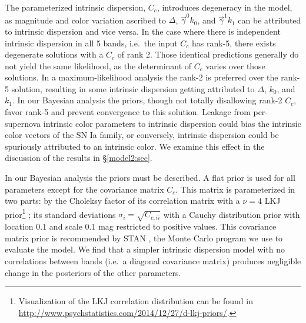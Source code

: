 \documentclass{aastex61}   	%
\begin{document}
The parameterized intrinsic dispersion, $C_c$,  introduces degeneracy in the model, as magnitude and color variation
ascribed to $\Delta$, $\vec{\gamma}^0 k_0$, and $\vec{\gamma}^1 k_1$ can  be attributed to intrinsic dispersion
\color{blue}
and vice versa.
In the case where there is independent intrinsic dispersion in all 5 bands, i.e.\  the input $C_c$ has rank-5, there exists degenerate solutions with a $C_c$ of rank 2.  Those identical predictions generally do not yield the same likelihood, as the determinant of $C_c$ varies over those solutions.  In a maximum-likelihood analysis the rank-2 is preferred over the rank-5 solution, resulting in some intrinsic dispersion getting attributed to $\Delta$, $k_0$, and $k_1$.
In our Bayesian analysis the priors, though not totally disallowing rank-2 $C_c$, favor rank-5  and prevent convergence to this solution.    
Leakage from per-supernova intrinsic color parameters to intrinsic dispersion could bias the intrinsic color vectors of the SN Ia family,  or conversely, intrinsic dispersion could be spuriously attributed to an intrinsic color.  We examine this effect in the discussion of the results in \S\ref{model2:sec}.
\color{black}
%



In our Bayesian analysis the priors must be described.  A flat prior is used for all parameters except
for the covariance matrix $C_c$.
\color{red}
This matrix is parameterized in two parts: by the Choleksy factor of its
\color{black}
correlation matrix with a $\nu=4$  LKJ prior\footnote{
Visualization of the LKJ correlation distribution can be found in \url{http://www.psychstatistics.com/2014/12/27/d-lkj-priors/}.}
\citep{Lewandowski20091989}; its standard
deviations $\sigma_i = \sqrt{C_{c,ii}}$ with a  Cauchy distribution prior with location
 $0.1$ and scale $0.1$ mag restricted to positive values.
This covariance matrix prior is recommended by STAN \citep{stan}, the Monte Carlo program we use to evaluate the model.
 We find that a simpler intrinsic dispersion model with no correlations between bands
 (i.e.\ a  diagonal covariance matrix) produces \color{red} negligible \color{black} change in the posteriors of
 the other parameters.
\end{document}
